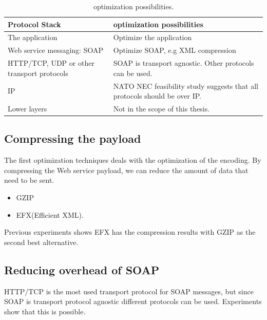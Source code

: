 \documentclass[USenglish]{ifimaster}
\begin{document}
\begin{table}[h]
\begin{tabularx}{\textwidth}{| X | X |}
\hline
  \textbf{Protocol Stack} & \textbf{optimization possibilities} \\ \hline
  The application & Optimize the application\\ \hline
  Web service messaging: SOAP & Optimize SOAP, e.g XML compression \\ \hline
  HTTP/TCP, UDP or other transport protocols & SOAP is transport agnostic. Other protocols can be used. \\ \hline
  IP & NATO NEC feasibility study suggests that all protocols should be over IP. \\ \hline
  Lower layers & Not in the scope of this thesis. \\ \hline
\end{tabularx}
\caption{optimization possibilities.} \label{table:optimalization-overview}
\end{table}


\subsection{Compressing the payload}
The first optimization techniques deals with the optimization of the encoding. By compressing the Web service payload, we can reduce the amount of data that need to be sent.
\begin{itemize}
\item GZIP
\item EFX(Efficient XML).
\end{itemize}
Previous experiments shows EFX has the compression results with GZIP as the second best alternative\cite{johnsen-trude-compression-techniqes}.

\subsection{Reducing overhead of SOAP}
HTTP/TCP is the most used transport protocol for SOAP messages, but since SOAP is transport protocol agnostic different protocols can be used. Experiments show that this is possible.
\end{document}
